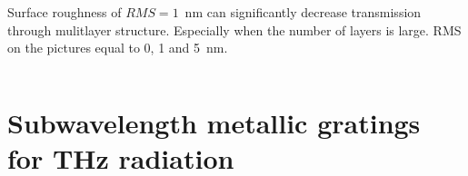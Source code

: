 \documentclass{beamer}
\begin{document}
\begin{frame}[t]
\begin{columns}
\begin{column}{0.5\textwidth}
				Surface roughness of $RMS=1$~nm can significantly decrease transmission through mulitlayer structure. Especially when the number of layers is large. RMS on the pictures equal to 0, 1 and 5~nm.
			
		\end{column}
	
	\end{columns}

	{\tiny \cite{pastuszczak2013engineering}}
		
\end{frame}



\section{Subwavelength metallic gratings for THz radiation}
\end{document}
